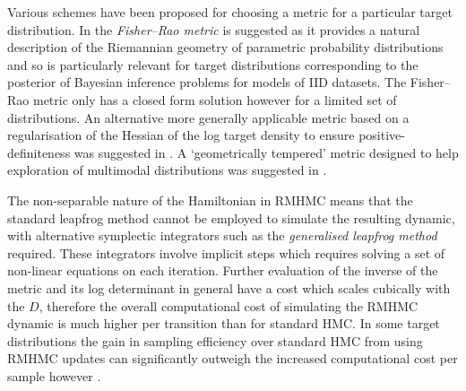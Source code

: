 Various schemes have been proposed for choosing a metric for a particular target distribution. In \citep{girolami2011riemann} the \emph{Fisher--Rao metric} \citep{amari1982differential} is suggested as it provides a natural description of the Riemannian geometry of parametric probability distributions and so is particularly relevant for target distributions corresponding to the posterior of Bayesian inference problems for models of \acs{IID} datasets. The Fisher--Rao metric only has a closed form solution however for a limited set of distributions. An alternative more generally applicable metric based on a regularisation of the Hessian of the log target density to ensure positive-definiteness was suggested in \citep{betancourt2013general}. A `geometrically tempered' metric designed to help exploration of multimodal distributions was suggested in \citep{nishimura2016geometrically}.

The non-separable nature of the Hamiltonian in \ac{RMHMC} means that the standard leapfrog method cannot be employed to simulate the resulting dynamic, with alternative symplectic integrators such as the \emph{generalised leapfrog method} \citep{leimkuhler2004simulating} required. These integrators involve implicit steps which requires solving a set of non-linear equations on each iteration. Further evaluation of the inverse of the metric and its log determinant in general have a cost which scales cubically with the $D$, therefore the overall computational cost of simulating the \ac{RMHMC} dynamic is much higher per transition than for standard \ac{HMC}. In some target distributions the gain in sampling efficiency over standard \ac{HMC} from using \ac{RMHMC} updates can significantly outweigh the increased computational cost per sample however \citep{girolami2011riemann,betancourt2013general}. 




